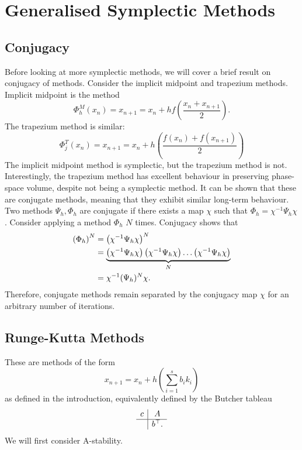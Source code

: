 \section{Generalised Symplectic Methods}

\subsection{Conjugacy}

Before looking at more symplectic methods, we will cover a brief result on conjugacy of methods.
Consider the implicit midpoint and trapezium methods. Implicit midpoint is the method
\begin{equation*}
	\Phi_h^M (x_n) = x_{n+1} = x_n + hf\left(\frac{x_n + x_{n+1}}{2}\right).
\end{equation*}
The trapezium method is similar:
\begin{equation*}
	\Phi_j^T (x_n) = x_{n+1} = x_n + h \left(\frac{f(x_n) + f(x_{n+1})}{2}\right)
\end{equation*}
The implicit midpoint method is symplectic, but the trapezium method is not.
Interestingly, the trapezium method has excellent behaviour in preserving phase-space volume, despite not being a symplectic method.
It can be shown that these are conjugate methods, meaning that they exhibit similar long-term behaviour.
Two methods $\Psi_h, \Phi_h$ are conjugate if there exists a map $\chi$ such that $\Phi_h = \chi^{-1} \Psi_h \chi$.
Consider applying a method $\Phi_h$ $N$ times. Conjugacy shows that
\begin{align*}
	\left(\Phi_h\right)^N &= \left(\chi^{-1} \Psi_h \chi\right)^N \\
	&= \underbrace{\left(\chi^{-1} \Psi_h \chi \right)\left(\chi^{-1} \Psi_h \chi \right) \mathellipsis \left(\chi^{-1} \Psi_h \chi\right)}_{N} \\
	&= \chi^{-1} (\Psi_h)^N \chi.
\end{align*}
Therefore, conjugate methods remain separated by the conjugacy map $\chi$ for an arbitrary number of iterations.

\subsection{Runge-Kutta Methods}

These are methods of the form
\begin{equation*}
	x_{n+1} = x_n + h \left( \sum_{i = 1}^{s} b_i k_i \right)
\end{equation*}
as defined in the introduction, equivalently defined by the Butcher tableau
\begin{equation*}
	\begin{array}{c|ccc}
		c &A \\
		\hline
		&b^\top .
	\end{array}
\end{equation*}
We will first consider A-stability.


